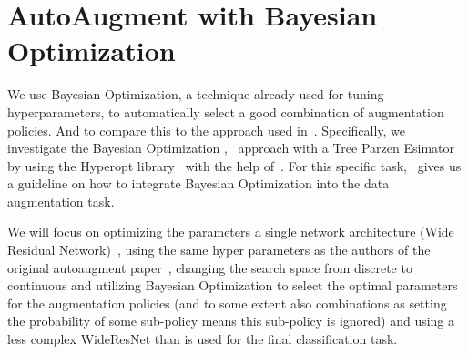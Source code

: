 \documentclass[10pt,twocolumn,letterpaper]{article}
\begin{document}
\section{AutoAugment with Bayesian Optimization}
We use Bayesian Optimization, a technique already used for tuning hyperparameters, to automatically select a good combination of augmentation policies. And to compare this to the approach used in~\cite{Ekin}. Specifically, we investigate the Bayesian Optimization \cite{2018arXiv180702811F},~\cite{Goodfellow-et-al-2016} approach with a Tree Parzen Esimator~\cite{Kaggle_AMT} by using the Hyperopt library~\cite{HyperOpt} with the help of~\cite{BO_Hyperopt}. For this specific task,~\cite{2017arXiv171010564T} gives us a guideline on how to integrate Bayesian Optimization into the data augmentation task.
\par
We will focus on optimizing the parameters a single network architecture (Wide Residual Network)~\cite{WRN}, using the same hyper parameters as the authors of the original autoaugment paper~\cite{Ekin}, changing the search space from discrete to continuous and utilizing Bayesian Optimization to select the optimal parameters for the augmentation policies (and to some extent also combinations as setting the probability of some sub-policy means this sub-policy is ignored) and using a less complex WideResNet than is used for the final classification task.
\end{document}
